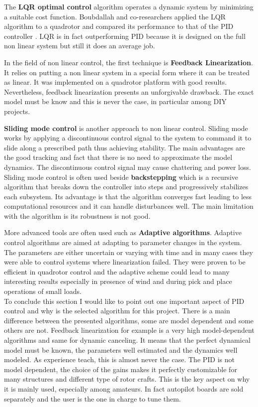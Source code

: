 The \textbf{LQR optimal control} algorithm operates a dynamic system by minimizing a suitable cost function. Boubdallah and co-researchers applied the LQR algorithm to a quadrotor and compared its performance to that of the PID controller \cite{BouabdallahLQR}. LQR is in fact outperforming PID because it is designed on the full non linear system but still it does an average job. \par In the field of non linear control, the first technique is \textbf{Feedback Linearization}. It relies on putting a non linear system in a special form where it can be treated as linear. It was implemented on a quadrotor platform \cite{Altug2002} with good results. Nevertheless, feedback linearization presents an unforgivable drawback. The exact model must be know and this is never the case, in particular among DIY projects.\par \textbf{Sliding mode control} is another approach to non linear control. Sliding mode works by applying a discontinuous control signal to the system to command it to slide along a prescribed path thus achieving stability. The main advantages are the good tracking and  fact that there is no need to approximate the model dynamics. The discontinuous control signal may cause chattering and power loss. Sliding mode control is often used beside \textbf{backstepping} \cite{Bouadi2007} which is a recursive algorithm that breaks down the controller into steps and progressively stabilizes each subsystem. Its advantage is that the algorithm converges fast leading to less computational resources and it can handle disturbances well. The main limitation with the algorithm is its robustness is not good. \par More advanced tools are often used such as \textbf{Adaptive algorithms}. Adaptive control algorithms are aimed at adapting to parameter changes in the system. The parameters are either uncertain or varying with time and in many cases they were able to control systems where linearization failed. They were proven to be efficient in quadrotor control \cite{Antonelli2013} and the adaptive scheme could lead to many interesting results especially in presence of wind and during pick and place operations of small loads.\\ 

To conclude this section I would like to point out one important aspect of PID control and why is the selected algorithm for this project. There is a main difference between the presented algorithms, some are model dependent and some others are not. Feedback linearization for example is a very high model-dependent algorithms and same for dynamic canceling. It means that the perfect dynamical model must be known, the parameters well estimated and the dynamics well modeled. As experience teach, this is almost never the case. The PID is not model dependent, the choice of the gains makes it perfectly customizable for many structures and different type of rotor crafts. This is the key aspect on why it is mainly used, especially among amateurs. In fact autopilot boards are sold separately and the user is the one in charge to tune them. 

